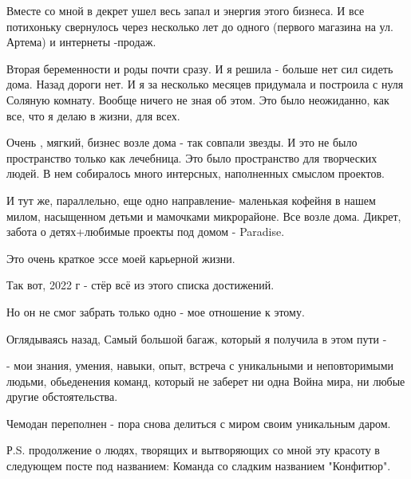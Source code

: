 Вместе со мной в декрет ушел весь запал и энергия этого бизнеса. И все
потихоньку свернулось через несколько лет  до одного (первого магазина на ул.
Артема) и интернеты -продаж.  

Вторая беременности и роды почти сразу. И я решила - больше нет сил сидеть
дома. Назад дороги нет. И я за несколько месяцев придумала и построила с нуля
Соляную комнату. Вообще ничего не зная об этом. Это было неожиданно, как все,
что я делаю в жизни, для всех.

Очень , мягкий, бизнес возле дома - так совпали звезды. И это не было
пространство только как лечебница. Это было пространство для творческих людей.
В нем собиралось много интерсных, наполненных смыслом проектов. 

И тут же, параллельно, еще одно направление- маленькая кофейня в нашем милом,
насыщенном детьми и мамочками микрорайоне. Все возле дома. Дикрет, забота о
детях+любимые проекты под домом -  Paradise.  

Это очень краткое эссе моей карьерной жизни.

Так вот, 2022 г -  стёр всё из этого списка достижений. 

Но он не смог забрать только одно - мое отношение к этому. 

Оглядываясь назад, Самый большой багаж, который я получила в этом пути -

- мои знания, умения, навыки, опыт, встреча с уникальными и неповторимыми
людьми, обьеденения команд,  который не заберет ни одна Война мира, ни любые
другие обстоятельства. 

Чемодан переполнен - пора снова делиться с миром своим уникальным даром. 

Р.S. продолжение о людях, творящих и вытворяющих со мной эту красоту в
следующем посте под названием: Команда со сладким названием "Конфитюр".

